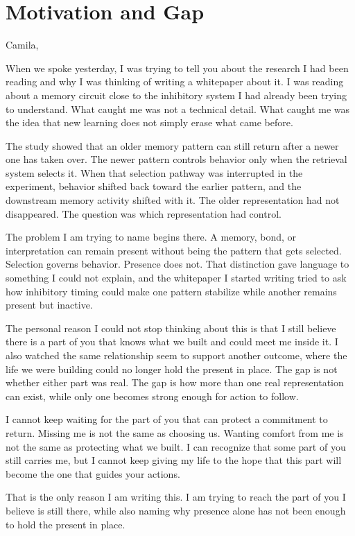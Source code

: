 \section{Motivation and Gap}

Camila,

When we spoke yesterday, I was trying to tell you about the research I had been reading and why I was thinking of writing a whitepaper about it. I was reading about a memory circuit close to the inhibitory system I had already been trying to understand. What caught me was not a technical detail. What caught me was the idea that new learning does not simply erase what came before.

The study showed that an older memory pattern can still return after a newer one has taken over. The newer pattern controls behavior only when the retrieval system selects it. When that selection pathway was interrupted in the experiment, behavior shifted back toward the earlier pattern, and the downstream memory activity shifted with it. The older representation had not disappeared. The question was which representation had control.

The problem I am trying to name begins there. A memory, bond, or interpretation can remain present without being the pattern that gets selected. Selection governs behavior. Presence does not. That distinction gave language to something I could not explain, and the whitepaper I started writing tried to ask how inhibitory timing could make one pattern stabilize while another remains present but inactive.

The personal reason I could not stop thinking about this is that I still believe there is a part of you that knows what we built and could meet me inside it. I also watched the same relationship seem to support another outcome, where the life we were building could no longer hold the present in place. The gap is not whether either part was real. The gap is how more than one real representation can exist, while only one becomes strong enough for action to follow.

I cannot keep waiting for the part of you that can protect a commitment to return. Missing me is not the same as choosing us. Wanting comfort from me is not the same as protecting what we built. I can recognize that some part of you still carries me, but I cannot keep giving my life to the hope that this part will become the one that guides your actions.

That is the only reason I am writing this. I am trying to reach the part of you I believe is still there, while also naming why presence alone has not been enough to hold the present in place.